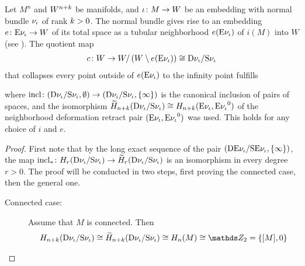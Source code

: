 \begin{Lem}\label{lem:thomisofundcl}
  Let $M^n$ and $W^{n+k}$ be manifolds, and
  ${\iota}\colon M\to W$ be an embedding with
  normal bundle $\nu_{{\iota}}$ of rank $k>0$.
  The normal bundle gives rise to an embedding
  $e\colon \mathrm{E}\nu_{{\iota}}\to W$ of its total space
  as a tubular neighborhood $e(\mathrm{E}\nu_{{\iota}})$ of $i(M)$ into $W$
  (see \cite[Sec.~15.6]{tomdieck}).
  The quotient map
  \begin{gather*}
    c\colon
     W
    \to  W/\left(  W\setminus e(\mathrm{E}\nu_{{\iota}}) \right)
    \cong \mathrm{D}\nu_{{\iota}}/\mathrm{S}\nu_{{\iota}}
  \end{gather*}
  that collapses every point outside of $e(\mathrm{E}\nu_{{\iota}})$ to the infinity
  point fulfills
  \begin{center}
  \end{center}
  where
  $\mathrm{incl}\colon
  (\mathrm{D}\nu_{{\iota}}/\mathrm{S}\nu_{{\iota}},\emptyset)
  \to(\mathrm{D}\nu_{{\iota}}/\mathrm{S}\nu_{{\iota}}, \{\infty\})$
  is the canonical inclusion of pairs of spaces,
  and the isomorphism
  $\widetilde{H}_{n+k}(\mathrm{D}\nu_{{\iota}}/\mathrm{S}\nu_{{\iota}})
  \cong H_{n+k}(\mathrm{E}\nu_{{\iota}}, {\mathrm{E}\nu_{{\iota}}}^0)$
  of the neighborhood deformation retract pair
  $(\mathrm{E}\nu_{{\iota}}, {\mathrm{E}\nu_{{\iota}}}^0)$ was used.
  This holds for any choice of $i$ and $e$.
  \begin{proof}
    First note that by the long exact sequence of the pair 
    $(\mathrm{D}\mathrm{E}\nu_{{\iota}}/\mathrm{S}\mathrm{E}\nu_{{\iota}}, \{\infty\})$, the map
    ${\mathrm{incl}}_*\colon
    H_r(\mathrm{D}\nu_{{\iota}}/\mathrm{S}\nu_{{\iota}})
    \to \widetilde{H}_r(\mathrm{D}\nu_{{\iota}}/\mathrm{S}\nu_{{\iota}})$
    is an isomorphism in every degree $r>0$. The proof will be
    conducted in two steps, first proving the connected case, then
    the general one.
    \begin{description}
    \item[Connected case:]
      Assume that $M$ is connected.
      Then
      \begin{gather*}
        \H_{n+k}(\Thomspace{\N{\emb}})
        \cong\relH_{n+k}(\Thomspace{\N{\emb}})
        \cong \H_n(M) \cong \Zmod2=\{\fundcl M, 0\}

\end{gather*}
\end{description}
\end{proof}
\end{Lem}
